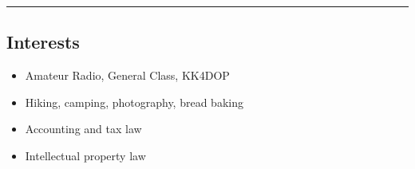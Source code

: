 \documentclass[10pt,letterpaper]{article}
\begin{document}
\hrule
\vspace{-0.4em}
\subsection*{Interests}
\begin{itemize}
    \item Amateur Radio, General Class, KK4DOP
    \item Hiking, camping, photography, bread baking
    \item Accounting and tax law
    \item Intellectual property law
\end{itemize}
\end{document}
